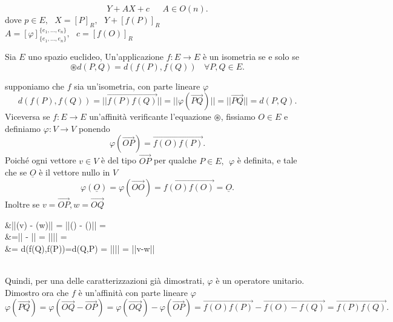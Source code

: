 \documentclass[12px]{article}
\begin{document}
\[
Y + AX + c \ \ \ \ \ \ \ A\in O(n)
.\] 
dove $p\in E, \ \ \ X = [P]_R, \ \ \ Y + [f(P)]_R$\\
$A = [\varphi]^{\{e_1,\ldots,e_n\}}_{\{e_1,\ldots,e_n\}}, \ \ \ c = [f(O)]_R$
\newpage
\begin{teo}
	Sia $E$ uno spazio euclideo, Un'applicazione $f:E \rightarrow E$ è un isometria se e solo se
	\[
	 \circledast d(P,Q) = d(f(P),f(Q))\ \ \ \ \forall P,Q\in E
	.\] 
\end{teo}
\begin{dimo}
	supponiamo che $f$ sia un'isometria, con parte lineare $\varphi$ 
	\[
	d(f(P),f(Q)) = ||\overrightarrow{f(P)f(Q)}|| = ||\varphi(\overrightarrow{PQ})|| = ||\overrightarrow{PQ}|| = d(P,Q)
	.\] 
	Viceversa se $f: E \rightarrow E$ un'affinità verificante l'equazione $\circledast$, fissiamo $O\in E$ e definiamo $\varphi:V \rightarrow V$ ponendo
	\[
	 \varphi(\overrightarrow{OP}) = \overrightarrow{f(O)f(P)}
	.\] 
	Poiché ogni vettore $v\in V$ è del tipo $\overrightarrow{OP}$ per qualche $P\in E, \ \ \varphi$ è definita, e tale che se $\underline{O}$ è il vettore nullo in $V$
	\[
		\varphi(\underline{O}) = \varphi(\overrightarrow{OO}) = \overrightarrow{f(O)f(O)} = \underline{O}
	.\]
	Inoltre se $v = \overrightarrow{OP}, w = \overrightarrow{OQ}$ \\
	\begin{aligned}
		&||\varphi(v) - \varphi(w)|| = ||\varphi() - \varphi()|| =\\
		&=|| - || = |||| =\\&= d(f(Q),f(P))=d(Q,P) = |||| = ||v-w||
	\end{aligned}\\
	Quindi, per una delle caratterizzazioni già dimostrati, $\varphi$ è un operatore unitario. Dimostro ora che $f$ è un'affinità con parte lineare $\varphi$
	\[
	\varphi(\overrightarrow{PQ}) = \varphi(\overrightarrow{OQ} - \overrightarrow{OP} ) = \varphi(\overrightarrow{OQ}) - \varphi(\overrightarrow{OP}) = \overrightarrow{f(O)f(P)} - \overrightarrow{f(O) - f(Q)} = \overrightarrow{f(P)f(Q)}
	.\] 
\end{dimo}
\end{document}
